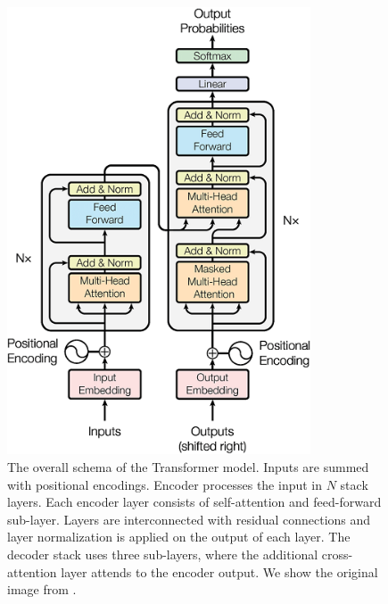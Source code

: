 \begin{figure}
  \centering
  \includegraphics[width=9cm]{img/transformer.png}

  \caption{The overall schema of the Transformer model. Inputs are summed with
    positional encodings. Encoder processes the input in $N$ stack layers. Each
    encoder layer consists of self-attention and feed-forward sub-layer. Layers
    are interconnected with residual connections and layer normalization is
    applied on the output of each layer. The decoder stack uses three
    sub-layers, where the additional cross-attention layer attends to the
    encoder output. We show the original image from
    \citet{vaswani2017attention}.}
  \label{fig:transformer}
\end{figure}

